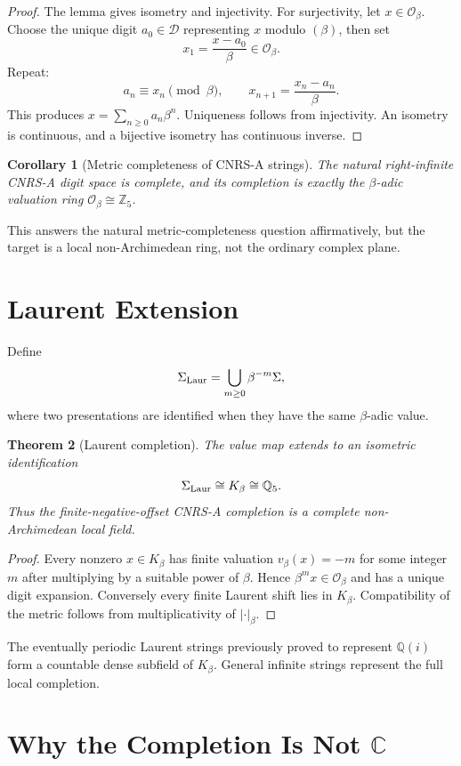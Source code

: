 \documentclass[11pt]{article}
\newtheorem{theorem}{Theorem}[section]
\newtheorem{corollary}[theorem]{Corollary}
\newcommand{\Z}{\mathbb Z}
\newcommand{\Q}{\mathbb Q}
\newcommand{\C}{\mathbb C}
\newcommand{\Qi}{\Q(i)}
\newcommand{\Db}{\mathcal D}
\newcommand{\Ob}{\mathcal O_\beta}
\newcommand{\Kb}{K_\beta}
\begin{document}
\begin{proof}
The lemma gives isometry and injectivity.  For surjectivity, let $x\in\Ob$.  Choose the unique digit $a_0\in\Db$ representing $x$ modulo $(\beta)$, then set
\[
x_1=\frac{x-a_0}{\beta}\in\Ob.
\]
Repeat:
\[
a_n\equiv x_n\pmod{\beta},\qquad
x_{n+1}=\frac{x_n-a_n}{\beta}.
\]
This produces $x=\sum_{n\ge0}a_n\beta^n$.  Uniqueness follows from injectivity.  An isometry is continuous, and a bijective isometry has continuous inverse.
\end{proof}

\begin{corollary}[Metric completeness of CNRS-A strings]
The natural right-infinite CNRS-A digit space is complete, and its completion is exactly the $\beta$-adic valuation ring $\Ob\cong\Z_5$.
\end{corollary}

This answers the natural metric-completeness question affirmatively, but the target is a local non-Archimedean ring, not the ordinary complex plane.

\section{Laurent Extension}

Define
\[
\Sigma_{\rm Laur}
=
\bigcup_{m\ge0}\beta^{-m}\Sigma,
\]
where two presentations are identified when they have the same $\beta$-adic value.

\begin{theorem}[Laurent completion]
The value map extends to an isometric identification
\[
\Sigma_{\rm Laur}\cong\Kb\cong\Q_5.
\]
Thus the finite-negative-offset CNRS-A completion is a complete non-Archimedean local field.
\end{theorem}

\begin{proof}
Every nonzero $x\in\Kb$ has finite valuation $v_\beta(x)=-m$ for some integer $m$ after multiplying by a suitable power of $\beta$.  Hence $\beta^m x\in\Ob$ and has a unique digit expansion.  Conversely every finite Laurent shift lies in $\Kb$.  Compatibility of the metric follows from multiplicativity of $|\cdot|_\beta$.
\end{proof}

The eventually periodic Laurent strings previously proved to represent $\Qi$ form a countable dense subfield of $\Kb$.  General infinite strings represent the full local completion.

\section{Why the Completion Is Not \texorpdfstring{$\C$}{C}}
\end{document}

